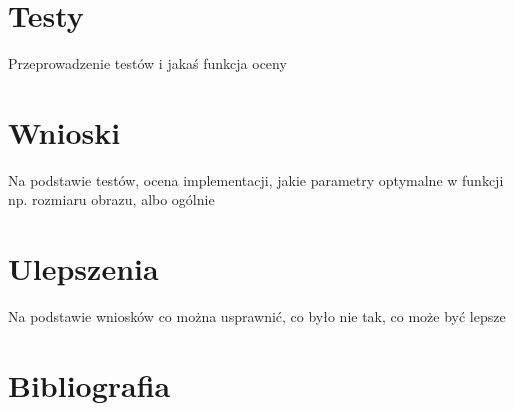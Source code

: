 \documentclass[A_4paper,12pt]{article}
\begin{document}
\section{Testy}
Przeprowadzenie testów i jakaś funkcja oceny

\section{Wnioski}
Na podstawie testów, ocena implementacji, jakie parametry optymalne w funkcji np. rozmiaru obrazu, albo ogólnie

\section{Ulepszenia}
Na podstawie wniosków co można usprawnić, co było nie tak, co może być lepsze

\section{Bibliografia}


\end{document}
